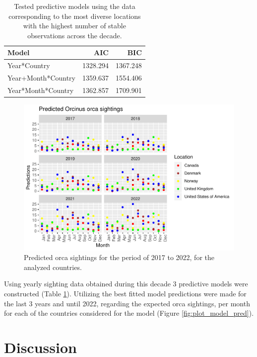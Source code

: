 \documentclass[10pt,letterpaper]{article}
\begin{document}
\begin{table}[t]

\caption{\label{tab:unnamed-chunk-7}\label{table:model_fits} Tested predictive models using the data corresponding to the most diverse locations with the highest number of stable observations across the decade.}
\centering
\begin{tabular}{l|r|r}
\hline
Model & AIC & BIC\\
\hline
Year*Country & 1328.294 & 1367.248\\
\hline
Year+Month*Country & 1359.637 & 1554.406\\
\hline
Year*Month*Country & 1362.857 & 1709.901\\
\hline
\end{tabular}
\end{table}

\begin{figure}
\includegraphics[width=1\linewidth]{SubjectEvaluation_3R_article_files/figure-latex/unnamed-chunk-8-1} \caption{\label{fig:plot_model_pred} Predicted orca sightings for the period of 2017 to 2022, for the analyzed countries.}\label{fig:unnamed-chunk-8}
\end{figure}

Using yearly sighting data obtained during this decade 3 predictive
models were constructed (Table \ref{table:model_fits}). Utilizing the
best fitted model predictions were made for the last 3 years and until
2022, regarding the expected orca sightings, per month for each of the
countries considered for the model (Figure \ref{fig:plot_model_pred}).

\FloatBarrier

\hypertarget{discussion}{%
\section{Discussion}\label{discussion}}
\end{document}
